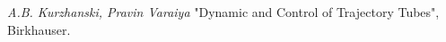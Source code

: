 \documentclass[12pt]{article}
\begin{document}

\newpage
\begin{thebibliography}{99}
 \textit{A.B. Kurzhanski, Pravin Varaiya} "Dynamic and Control of Trajectory Tubes", Birkhauser.
\end{thebibliography}
\end{document}
